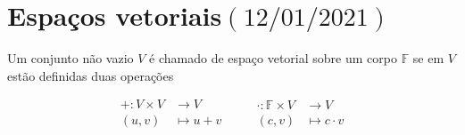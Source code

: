 \chapter{Espaços vetoriais\quad$\left(12/01/2021\right)$}

\begin{definition}
  Um conjunto não vazio $V$ é chamado de espaço vetorial sobre um corpo $\mathbb{F}$ se em $V$ estão definidas duas operações

  \[
    \begin{aligned}
      +\colon V\times V & \longrightarrow V \\
      \left(u,v\right)  & \longmapsto u+v
    \end{aligned}\qquad
    \begin{aligned}
      \cdot\colon\mathbb{F}\times V & \longrightarrow V    \\
      \left(c,v\right)              & \longmapsto c\cdot v
    \end{aligned}
  \]

\end{definition}










